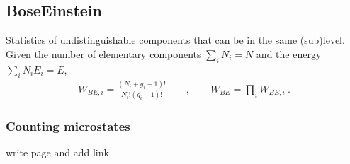 \documentclass[letterpaper,10pt,english]{jupyterBook}
\begin{document}
\subsection{Bose\sphinxhyphen{}Einstein}
\label{\detokenize{ch/statistical-mechanics/notes:bose-einstein}}\label{\detokenize{ch/statistical-mechanics/notes:statistical-mechanics-notes-distributions-be}}
\sphinxAtStartPar
Statistics of undistinguishable components that can be in the same (sub)level.
Given the number of elementary components \(\sum_{i} N_i = N\) and the energy \(\sum_{i} N_i E_i = E\),
\begin{equation}\label{equation:ch/statistical-mechanics/notes:eq:be}
\begin{split}W_{BE,i} = \frac{(N_i + g_i - 1)!}{N_i! (g_i-1)!} \qquad , \qquad W_{BE} = \prod_i W_{BE,i} \ .\end{split}
\end{equation}\subsubsection*{Counting microstates}

\sphinxAtStartPar
{} write page  and add link
\end{document}
